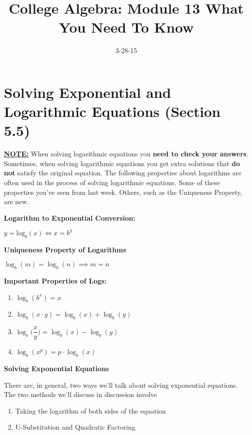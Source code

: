 \documentclass[12pt]{article}
\newenvironment{myindentpar}[1]%
     {\begin{list}{}%
             {\setlength{\leftmargin}{#1}}%
             \item[]%
     }
     {\end{list}}
\begin{document}
\title{College Algebra: Module 13 What You Need To Know}
\date{3-28-15}
\author{}
\maketitle

\section{Solving Exponential and Logarithmic Equations (Section 5.5)}

\underline{\textbf{NOTE:}} When solving logarithmic equations you \textbf{need to check your answers}. Sometimes, when solving logarithmic equations you get extra solutions that \textbf{do not} satisfy the original equation. The following properties about logarithms are often used in the process of solving logarithmic equations. Some of these properties you've seen from last week. Others, such as the Uniqueness Property, are new.

\textbf{Logarithm to Exponential Conversion:}
\newline

\centerline{$y = \text{log}_{b}(x) \Leftrightarrow x = b^{y}$}

\textbf{Uniqueness Property of Logarithms}
\newline

\centerline{$\log_{b}(m) = \log_{b}(n) \implies m = n$}

\textbf{Important Properties of Logs:} 
\begin{myindentpar}{2cm}
\begin{enumerate}
\item $\log_{b}(b^{x})= x$
\item $\log_{b}(x \cdot y) = \log_{b}(x) + \log_{b}(y)$ 
\item $\log_{b}\Big(\dfrac{x}{y}\Big) = \log_{b}(x) - \log_{b}(y)$
\item $\log_{b}(x^{p}) = p \cdot \log_{b}(x)$
\end{enumerate}
\end{myindentpar}

\textbf{Solving Exponential Equations} 

There are, in general, two ways we'll talk about solving exponential equations. The two methods we'll discuss in discussion involve

\begin{enumerate}

\item Taking the logarithm of both sides of the equation
\item U-Substitution and Quadratic Factoring

\end{enumerate}
\end{document}
